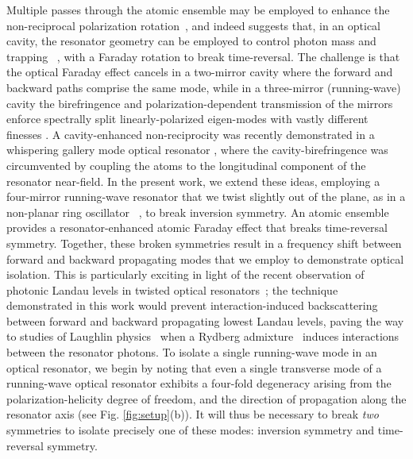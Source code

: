 \documentclass[aps,pra,twocolumn,groupedaddress,10pt,showpacs]{revtex4-1}
\begin{document}
Multiple passes through the atomic ensemble may be employed to enhance the non-reciprocal polarization rotation~\cite{RomalisFaraday2011}, and indeed suggests that, in an optical cavity, the resonator geometry can be employed to control photon mass and trapping ~\cite{sommer2016engineering}, with a Faraday rotation to break time-reversal. The challenge is that the optical Faraday effect cancels in a two-mirror cavity where the forward and backward paths comprise the same mode, while in a three-mirror (running-wave) cavity the birefringence and polarization-dependent transmission of the mirrors enforce spectrally split linearly-polarized eigen-modes with vastly different finesses \cite{nagorny2003collective,klinner2006normal}. A cavity-enhanced non-reciprocity was recently demonstrated in a whispering gallery mode optical resonator \cite{sayrin2015nanophotonic}, where the cavity-birefringence was circumvented by coupling the atoms to the longitudinal component of the resonator near-field. In the present work, we extend these ideas, employing a four-mirror running-wave resonator that we twist slightly out of the plane, as in a non-planar ring oscillator ~\cite{NPRO1986}, to break inversion symmetry. An atomic ensemble provides a resonator-enhanced atomic Faraday effect that breaks time-reversal symmetry. Together, these broken symmetries result in a frequency shift between forward and backward propagating modes that we employ to demonstrate optical isolation. This is particularly exciting in light of the recent observation of photonic Landau levels in twisted optical resonators~\cite{schine2016synthetic,sommer2016engineering}; the technique demonstrated in this work would prevent interaction-induced backscattering between forward and backward propagating lowest Landau levels, paving the way to studies of Laughlin physics~\cite{umuc2014prob,somm2015quan,grusdt2013fractional} when a Rydberg admixture~\cite{pari2012obse,Jia2016CavityRydPol,jia2017strongly} induces interactions between the resonator photons. To isolate a single running-wave mode in an optical resonator, we begin by noting that even a single transverse mode of a running-wave optical resonator exhibits a four-fold degeneracy arising from the polarization-helicity degree of freedom, and the direction of propagation along the resonator axis (see Fig. \ref{fig:setup}(b)). It will thus be necessary to break \emph{two} symmetries to isolate precisely one of these modes: inversion symmetry and time-reversal symmetry.
\end{document}
